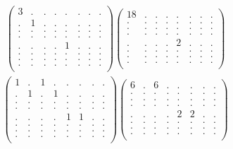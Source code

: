 \documentclass[12pt,a4paper]{amsart}
\begin{document}
\begin{align*}
\left(\begin{array}{rrrrrrrr}%
3&.&.&.&.&.&.&.\\%
.&1&.&.&.&.&.&.\\%
.&.&.&.&.&.&.&.\\%
.&.&.&.&.&.&.&.\\%
.&.&.&.&1&.&.&.\\%
.&.&.&.&.&.&.&.\\%
.&.&.&.&.&.&.&.\\%
.&.&.&.&.&.&.&.\\%
\end{array}\right)%
\left(\begin{array}{rrrrrrrr}%
18&.&.&.&.&.&.&.\\%
.&.&.&.&.&.&.&.\\%
.&.&.&.&.&.&.&.\\%
.&.&.&.&.&.&.&.\\%
.&.&.&.&2&.&.&.\\%
.&.&.&.&.&.&.&.\\%
.&.&.&.&.&.&.&.\\%
.&.&.&.&.&.&.&.\\%
\end{array}\right)%
\end{align*}
\begin{align*}
\left(\begin{array}{rrrrrrrr}%
1&.&1&.&.&.&.&.\\%
.&1&.&1&.&.&.&.\\%
.&.&.&.&.&.&.&.\\%
.&.&.&.&.&.&.&.\\%
.&.&.&.&1&1&.&.\\%
.&.&.&.&.&.&.&.\\%
.&.&.&.&.&.&.&.\\%
.&.&.&.&.&.&.&.\\%
\end{array}\right)%
\left(\begin{array}{rrrrrrrr}%
6&.&6&.&.&.&.&.\\%
.&.&.&.&.&.&.&.\\%
.&.&.&.&.&.&.&.\\%
.&.&.&.&.&.&.&.\\%
.&.&.&.&2&2&.&.\\%
.&.&.&.&.&.&.&.\\%
.&.&.&.&.&.&.&.\\%
.&.&.&.&.&.&.&.\\%
\end{array}\right)%
\end{align*}
\end{document}
